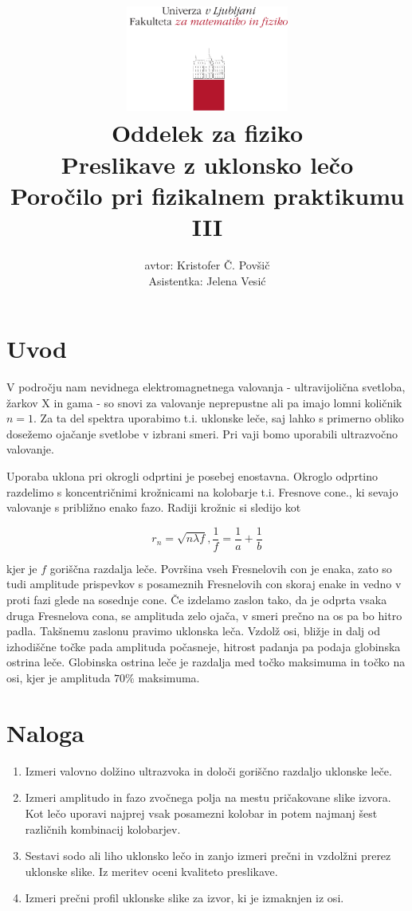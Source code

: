 \documentclass[12pt]{report}
\title{
  \includegraphics[width=0.4\textwidth]{fmf_logo}\\
  {\small Oddelek za fiziko} \\
  {Preslikave z uklonsko lečo}\\
  {\small Poročilo pri fizikalnem praktikumu III}\\

}
\date{}
\author{ avtor: Kristofer Č. Povšič \\[5 cm]
 \small  Asistentka: Jelena Vesić
}
\begin{document}
\setcounter{page}{2}

\maketitle

\chapter*{Uvod}

V področju nam nevidnega elektromagnetnega valovanja - ultravijolična svetloba, žarkov X in gama - so snovi za valovanje neprepustne ali pa imajo lomni količnik $n=1$. Za ta del spektra uporabimo t.i. uklonske leče, saj lahko s primerno obliko dosežemo ojačanje svetlobe v izbrani smeri. Pri vaji bomo uporabili ultrazvočno valovanje. 

Uporaba uklona pri okrogli odprtini je posebej enostavna. Okroglo odprtino razdelimo s koncentričnimi krožnicami na kolobarje t.i. Fresnove cone., ki sevajo valovanje s približno enako fazo. Radiji krožnic si sledijo kot 

\begin{equation}\label{eq:1}
  r_n = \sqrt{n \lambda f}, \frac{1}{f} = \frac{1}{a} + \frac{1}{b}
\end{equation}

kjer je $f$ goriščna razdalja leče. Površina vseh Fresnelovih con je enaka, zato so tudi amplitude prispevkov s posameznih Fresnelovih con skoraj enake in vedno v proti fazi glede na sosednje cone. Če izdelamo zaslon tako, da je odprta vsaka druga Fresnelova cona, se amplituda zelo ojača, v smeri prečno na os pa bo hitro padla. Takšnemu zaslonu pravimo uklonska leča. Vzdolž osi, bližje in dalj od izhodiščne točke pada amplituda počasneje, hitrost padanja pa podaja globinska ostrina leče. Globinska ostrina leče je razdalja med točko maksimuma in točko na osi, kjer je amplituda $70\%$ maksimuma. 

\chapter*{Naloga}

\begin{enumerate}
  \item Izmeri valovno dolžino ultrazvoka in določi goriščno razdaljo uklonske leče.
  \item Izmeri amplitudo in fazo zvočnega polja na mestu pričakovane slike izvora. Kot lečo uporavi najprej vsak posamezni kolobar in potem najmanj šest različnih kombinacij kolobarjev. 
  \item Sestavi sodo ali liho uklonsko lečo in zanjo izmeri prečni in vzdolžni prerez uklonske slike. Iz meritev oceni kvaliteto preslikave. 
  \item Izmeri prečni profil uklonske slike za izvor, ki je izmaknjen iz osi. 
\end{enumerate}
\end{document}
